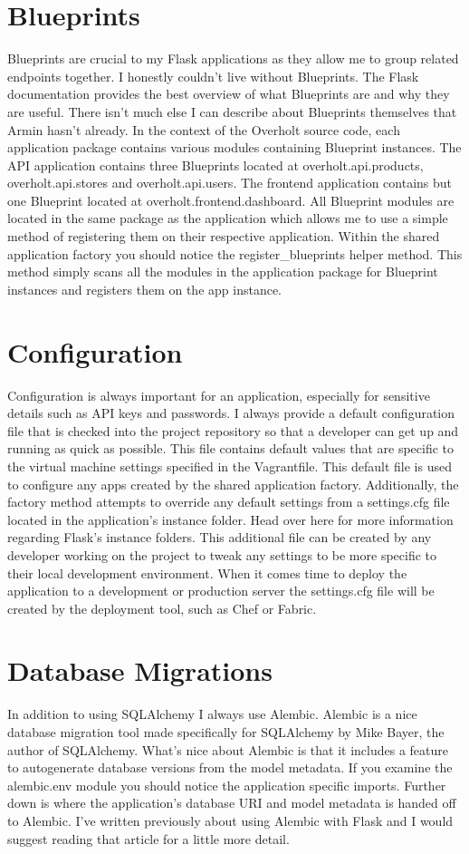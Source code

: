 \section{Blueprints}
Blueprints are crucial to my Flask applications as they allow me to group related endpoints together. I honestly couldn't live without Blueprints. The Flask documentation provides the best overview of what Blueprints are and why they are useful. There isn't much else I can describe about Blueprints themselves that Armin hasn't already. In the context of the Overholt source code, each application package contains various modules containing Blueprint instances. The API application contains three Blueprints located at overholt.api.products, overholt.api.stores and overholt.api.users. The frontend application contains but one Blueprint located at overholt.frontend.dashboard. All Blueprint modules are located in the same package as the application which allows me to use a simple method of registering them on their respective application. Within the shared application factory you should notice the register\_blueprints helper method. This method simply scans all the modules in the application package for Blueprint instances and registers them on the app instance.
\section{Configuration}
Configuration is always important for an application, especially for sensitive details such as API keys and passwords. I always provide a default configuration file that is checked into the project repository so that a developer can get up and running as quick as possible. This file contains default values that are specific to the virtual machine settings specified in the Vagrantfile. This default file is used to configure any apps created by the shared application factory. Additionally, the factory method attempts to override any default settings from a settings.cfg file located in the application's instance folder. Head over here for more information regarding Flask's instance folders. This additional file can be created by any developer working on the project to tweak any settings to be more specific to their local development environment. When it comes time to deploy the application to a development or production server the settings.cfg file will be created by the deployment tool, such as Chef or Fabric.
\section{Database Migrations}
In addition to using SQLAlchemy I always use Alembic. Alembic is a nice database migration tool made specifically for SQLAlchemy by Mike Bayer, the author of SQLAlchemy. What's nice about Alembic is that it includes a feature to autogenerate database versions from the model metadata. If you examine the alembic.env module you should notice the application specific imports. Further down is where the application's database URI and model metadata is handed off to Alembic. I've written previously about using Alembic with Flask and I would suggest reading that article for a little more detail.

